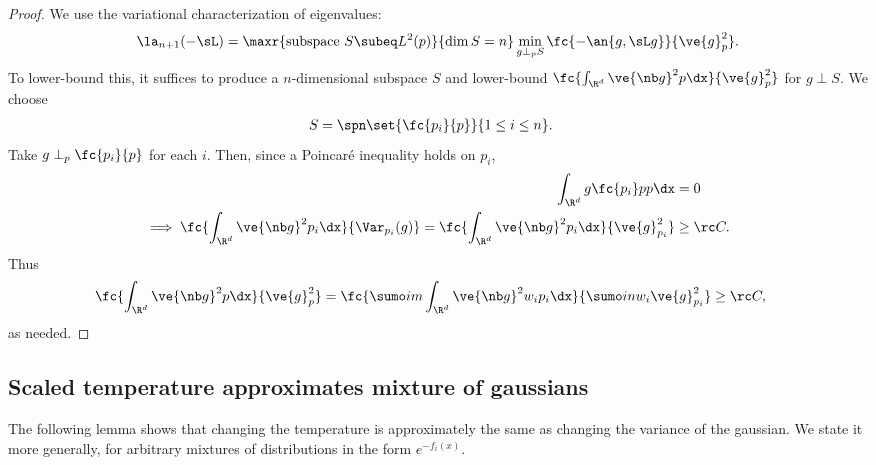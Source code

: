\begin{proof}
We use the variational characterization of eigenvalues:
$$
\la_{n+1}(-\sL) = \maxr{\text{subspace }S\subeq L^2(p)}{ \dim S = n}\min_{g\perp_p S}
\fc{-\an{g,\sL g}}{\ve{g}_p^2}.
$$
To lower-bound this, it suffices to produce a $n$-dimensional subspace $S$ and lower-bound $\fc{\int_{\R^d}\ve{\nb g}^2p\dx}{\ve{g}_p^2}$ for $g\perp S$.
We choose
\begin{align}
S &= \spn\set{\fc{p_i}{p}}{1\le i\le n}.
\end{align}
Take $g\perp_p \fc{p_i}{p}$ for each $i$. Then, since a Poincar\'e inequality holds on $p_i$,
\begin{align}
\int_{\R^d} g\fc{p_i}p p\dx&=0\\
\implies
\fc{\int_{\R^d}\ve{\nb g}^2 p_i\dx}{\Var_{p_i}(g)} = 
\fc{\int_{\R^d}\ve{\nb g}^2 p_i\dx}{\ve{g}_{p_i}^2}
&\ge\rc C.
\end{align}
Thus
\begin{align}
\fc{\int_{\R^d}\ve{\nb g}^2p\dx}{\ve{g}_p^2}
& = \fc{\sumo im \int_{\R^d}\ve{\nb g}^2w_ip_i\dx}{\sumo in  w_i \ve{g}_{p_i}^2}\ge \rc C,
\end{align}
as needed.
\end{proof}

\subsection{Scaled temperature approximates mixture of gaussians}
\label{subsec:multiplicative}
The following lemma shows that changing the temperature is approximately the same as changing the variance of the gaussian. We state it more generally, for arbitrary mixtures of distributions in the form $e^{-f_i(x)}$. 

